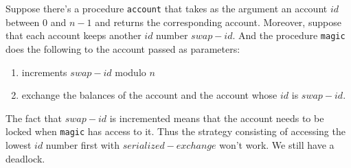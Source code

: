 \documentclass[a4paper,12pt]{article}
\begin{document}
Suppose there's a procedure \lstinline!account! that takes as the
argument an account $id$ between $0$ and $n-1$ and returns the
corresponding account.  Moreover, suppose that each account keeps
another $id$ number $swap-id$.  And the procedure \lstinline!magic!
does the following to the account passed as parameters:
\begin{enumerate}
\item
  increments $swap-id$ modulo $n$
\item exchange the balances of the account and the account
  whose $id$ is $swap-id$.
\end{enumerate}
The fact that $swap-id$ is incremented means that the account needs to
be locked when \lstinline!magic! has access to it.  Thus the
strategy consisting of accessing the lowest $id$ number first with
$serialized-exchange$ won't work.  We still have a deadlock.
\end{document}
